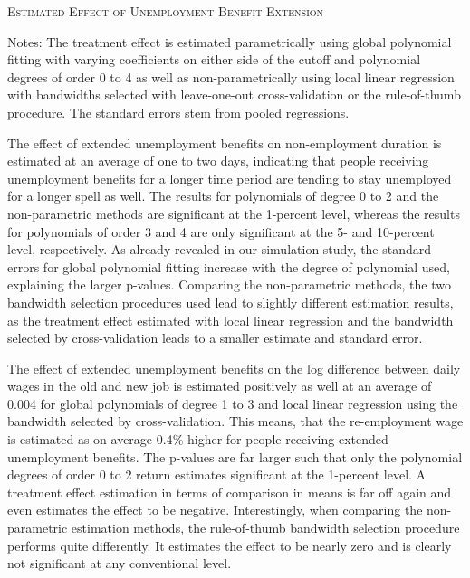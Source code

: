 \documentclass[11pt, a4paper, leqno]{article}
\numberwithin{equation}{section}
\numberwithin{figure}{section}
\numberwithin{table}{section}
\numberwithin{algorithm}{section}
\begin{document}
\begin{table}[H]
	\centering
	\hspace{\fill}
	
	\caption{\textsc{Estimated Effect of Unemployment Benefit Extension}}
	\label{tab: estim_ui_benefits}
	\medskip
	\justify
	\footnotesize{Notes: The treatment effect is estimated parametrically using global polynomial fitting with varying coefficients on either side of the cutoff and polynomial degrees of order 0 to 4 as well as non-parametrically using local linear regression with bandwidths selected with leave-one-out cross-validation or the rule-of-thumb procedure. The standard errors stem from pooled regressions.}
\end{table}

The effect of extended unemployment benefits on non-employment duration is estimated at an average of one to two days, indicating that people receiving unemployment benefits for a longer time period are tending to stay unemployed for a longer spell as well. The results for polynomials of degree 0 to 2 and the non-parametric methods are significant at the 1-percent level, whereas the results for polynomials of order 3 and 4 are only significant at the 5- and 10-percent level, respectively. As already revealed in our simulation study, the standard errors for global polynomial fitting increase with the degree of polynomial used, explaining the larger p-values. Comparing the non-parametric methods, the two bandwidth selection procedures used lead to slightly different estimation results, as the treatment effect estimated with local linear regression and the bandwidth selected by cross-validation leads to a smaller estimate and standard error.

The effect of extended unemployment benefits on the log difference between daily wages in the old and new job is estimated positively as well at an average of 0.004 for global polynomials of degree 1 to 3 and local linear regression using the bandwidth selected by cross-validation. This means, that the re-employment wage is estimated as on average 0.4$\%$ higher for people receiving extended unemployment benefits. The p-values are far larger such that only the polynomial degrees of order 0 to 2 return estimates significant at the 1-percent level. A treatment effect estimation in terms of comparison in means is far off again and even estimates the effect to be negative. Interestingly, when comparing the non-parametric estimation methods, the rule-of-thumb bandwidth selection procedure performs quite differently. It estimates the effect to be nearly zero and is clearly not significant at any conventional level.
\end{document}
